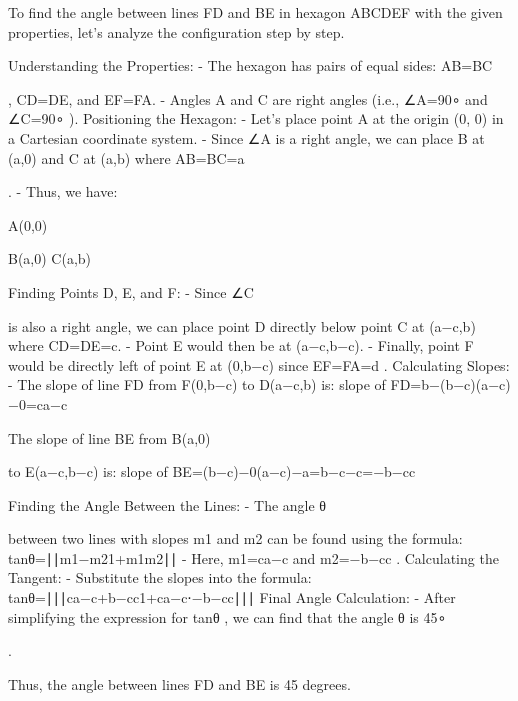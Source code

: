 To find the angle between lines FD and BE in hexagon ABCDEF with the given properties, let's analyze the configuration step by step.

    Understanding the Properties:
    - The hexagon has pairs of equal sides: AB=BC

, CD=DE, and EF=FA.
- Angles A and C are right angles (i.e., ∠A=90∘ and ∠C=90∘
).
Positioning the Hexagon:
- Let's place point A
at the origin (0, 0) in a Cartesian coordinate system.
- Since ∠A is a right angle, we can place B at (a,0) and C at (a,b) where AB=BC=a

    .
    - Thus, we have:

        A(0,0)

B(a,0)
C(a,b)

    Finding Points D, E, and F:
    - Since ∠C

is also a right angle, we can place point D directly below point C at (a−c,b) where CD=DE=c.
- Point E would then be at (a−c,b−c).
- Finally, point F would be directly left of point E at (0,b−c) since EF=FA=d
.
Calculating Slopes:
- The slope of line FD from F(0,b−c)
to D(a−c,b) is:
slope of FD=b−(b−c)(a−c)−0=ca−c

    The slope of line BE from B(a,0)

to E(a−c,b−c) is:
slope of BE=(b−c)−0(a−c)−a=b−c−c=−b−cc

    Finding the Angle Between the Lines:
    - The angle θ

between two lines with slopes m1 and m2 can be found using the formula:
tanθ=∣∣m1−m21+m1m2∣∣
- Here, m1=ca−c and m2=−b−cc
.
Calculating the Tangent:
- Substitute the slopes into the formula:
tanθ=∣∣∣ca−c+b−cc1+ca−c⋅−b−cc∣∣∣
Final Angle Calculation:
- After simplifying the expression for tanθ
, we can find that the angle θ is 45∘

    .

Thus, the angle between lines FD and BE is 45 degrees.